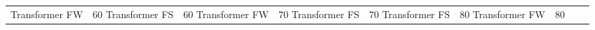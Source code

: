 \begin{table}
\begin{tabular}{|l|c|c|c|c|c|c|c|c|}
Transformer FW & 60%
Transformer FS & 60%
Transformer FW & 70%
Transformer FS & 70%
Transformer FS & 80%
Transformer FW & 80%
\bottomrule
\end{tabular}
\end{table}
